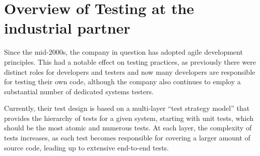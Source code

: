 \section{Overview of Testing at the industrial partner}\label{sec:ind_overview}

%

%
%

Since the mid-2000s, the company in question has adopted agile development principles.
This had a notable effect on testing practices, as previously there were distinct roles for developers and testers and now many developers are responsible for testing their own code, although the company also continues to employ a substantial number of dedicated systems testers.

Currently, their test design is based on a multi-layer ``test strategy model'' that provides the hierarchy of tests for a given system, starting with unit tests, which should be the most atomic and numerous tests.
At each layer, the complexity of tests increases, as each test becomes responsible for covering a larger amount of source code, leading up to extensive end-to-end tests.

